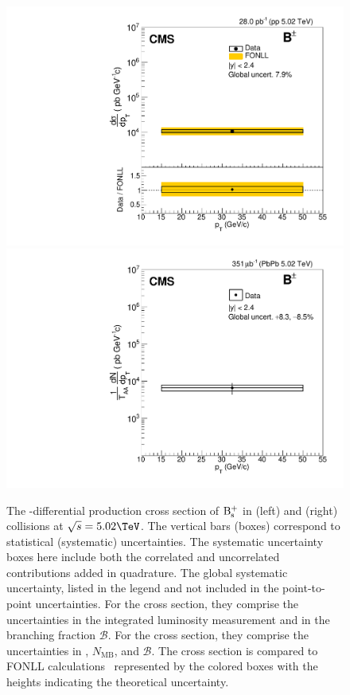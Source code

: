 \begin{figure}[tb]
\centering
\includegraphics[width=.45\textwidth]{plots/canvasSigmaBplusRatiopp.pdf}
\includegraphics[width=.45\textwidth]{plots/canvasSigmaBplusRatioPbPb_0_100.pdf}
\caption{
The \pt-differential production cross section of $\rm B_{\rm s }^{+}$ in \pp (left) and \PbPb (right) collisions at $\sqrts=5.02\TeV$. The vertical bars (boxes) correspond to statistical (systematic) uncertainties.
The systematic uncertainty boxes here include both the correlated and uncorrelated contributions added in quadrature. The global systematic uncertainty, listed in the legend and not included in the point-to-point uncertainties. 
For the \pp cross section, they comprise the uncertainties in the integrated luminosity measurement and in the branching fraction $\mathcal{B}$. For the \PbPb cross section, they comprise the uncertainties in \TAA, $N_{\text{MB}}$, and $\mathcal{B}$.
The \pp cross section is compared to FONLL calculations~\cite{FONLLcharmbottomPP1,FONLLcharmbottomPP2,FONLLcharmbottomPP3} represented by the colored boxes with the heights indicating the theoretical uncertainty.}
\label{fig:crosssections}
\end{figure}


